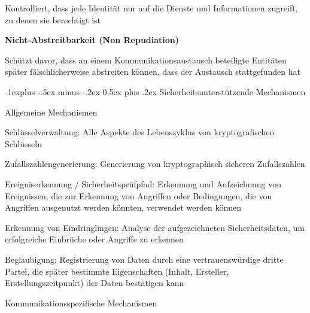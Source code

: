 \documentclass[a4paper]{article}
\makeatletter
\renewcommand{\subsection}{\@startsection{subsection}{2}{0mm}%
 {-1explus -.5ex minus -.2ex}%
 {0.5ex plus .2ex}%
 {\normalfont\normalsize\bfseries}}
\makeatother
\begin{document}
\begin{multicols}{3}
\begin{itemize*}
            \begin{itemize*}
                  \item Kontrolliert, dass jede Identität nur auf die Dienste und Informationen zugreift, zu denen sie berechtigt ist
            \end{itemize*}
            \item
            \textbf{Nicht-Abstreitbarkeit (Non Repudiation)}

            \begin{itemize*}
                  \item Schützt davor, dass an einem Kommunikationsaustausch beteiligte Entitäten später fälschlicherweise abstreiten können, dass der Austausch stattgefunden hat
            \end{itemize*}
      \end{itemize*}


      \subsection{Sicherheitsunterstützende
            Mechanismen}

      \begin{itemize*}
            \item
            Allgemeine Mechanismen

            \begin{itemize*}
                  \item Schlüsselverwaltung: Alle Aspekte des Lebenszyklus von kryptografischen Schlüsseln
                  \item Zufallszahlengenerierung: Generierung von kryptographisch sicheren Zufallszahlen
                  \item Ereigniserkennung / Sicherheitsprüfpfad: Erkennung und Aufzeichnung von Ereignissen, die zur Erkennung von Angriffen oder Bedingungen, die von Angriffen ausgenutzt werden könnten, verwendet werden können
                  \item Erkennung von Eindringlingen: Analyse der aufgezeichneten Sicherheitsdaten, um erfolgreiche Einbrüche oder Angriffe zu erkennen
                  \item Beglaubigung: Registrierung von Daten durch eine vertrauenswürdige dritte Partei, die später bestimmte Eigenschaften (Inhalt, Ersteller, Erstellungszeitpunkt) der Daten bestätigen kann
            \end{itemize*}
            \item
            Kommunikationsspezifische Mechanismen


\end{itemize*}
\end{multicols}
\end{document}
